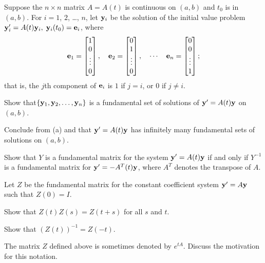 \begin{exerciselist}
\item\label{exer:10.3.16}Suppose the $n\times n$  matrix $A=A(t)$ is
continuous on $(a,b)$ and $t_0$ is in $(a,b)$.
 For $i=1$, $2$, \dots, $n$, let $\mathbf{y}_i$ be the solution of the initial
value
problem $\mathbf{y}_i'=A(t)\mathbf{y}_i,\; \mathbf{y}_i(t_0)=\mathbf{e}_i$, where
\[
\mathbf{e}_1=\begin{bmatrix} 1\\0\\ \vdots\\0\end{bmatrix},\quad
\mathbf{e}_2=\begin{bmatrix} 0\\1\\\vdots\\0\end{bmatrix},\quad\cdots\quad
\mathbf{e}_n=\begin{bmatrix} 0\\0\\ \vdots\\1\end{bmatrix};
\]
that is, the $j$th component of $\mathbf{e}_i$ is $1$ if $j=i$, or $0$ if
$j\ne i$.

\begin{alist}
\item %
 Show that$\{\mathbf{y}_1,\mathbf{y}_2,\dots,\mathbf{y}_n\}$ is a fundamental set of
solutions of $\mathbf{y}'=A(t)\mathbf{y}$ on  $(a,b)$.

\item %
 Conclude from (a) and   that $\mathbf{y}'=
A(t)\mathbf{y}$ has infinitely many fundamental sets of solutions on
$(a,b)$.
\end{alist}

\item\label{exer:10.3.17}Show that $Y$ is a
fundamental matrix for the system $\mathbf{y}'=A(t)\mathbf{y}$ if and only
if $Y^{-1}$ is a fundamental matrix for $\mathbf{y}'=-
A^T(t)\mathbf{y}$, where $A^T$ denotes the transpose of $A$.

\item\label{exer:10.3.18}Let $Z$ be the fundamental matrix for the constant coefficient system
 $\mathbf{y}'=A\mathbf{y}$ such that $Z(0)=I$.
\begin{alist}
\item %
Show that $Z(t)Z(s)=Z(t+s)$ for all $s$ and $t$. 
\item %
Show that $(Z(t))^{-1}=Z(-t)$.
\item %
The matrix $Z$ defined above is sometimes denoted by $e^{tA}$. Discuss
 the motivation for this notation.
\end{alist}


\end{exerciselist}

